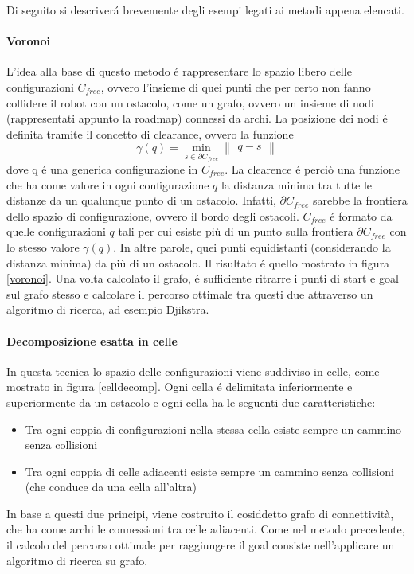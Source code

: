 \documentclass[14pt,a4paper]{extarticle}
\begin{document}
Di seguito si descriverá brevemente degli esempi legati ai metodi appena elencati.

\paragraph{Voronoi} L'idea alla base di questo metodo é rappresentare lo spazio libero delle configurazioni \(C_{free}\), ovvero l'insieme di quei punti che per certo non fanno collidere il robot con un ostacolo, come un grafo, ovvero un insieme di nodi (rappresentati appunto la roadmap) connessi da archi. La posizione dei nodi é definita tramite il concetto di clearance, ovvero la funzione \[\gamma(q) = \min_{s\in\partial C_{free}} \begin{Vmatrix}q-s\end{Vmatrix}\] dove q é una generica configurazione in \(C_{free}\). La clearence é perciò una funzione che ha come valore in ogni configurazione \(q\) la distanza minima tra tutte le distanze da un qualunque punto di un ostacolo. Infatti, \(\partial C_{free}\) sarebbe la frontiera dello spazio di configurazione, ovvero il bordo degli ostacoli. \(C_{free}\) é formato da quelle configurazioni \(q\) tali per cui esiste più di un punto sulla frontiera \(\partial C_{free}\) con lo stesso valore \(\gamma(q)\). In altre parole, quei punti equidistanti (considerando la distanza minima) da più di un ostacolo. Il risultato é quello mostrato in figura \ref{voronoi}. Una volta calcolato il grafo, é sufficiente ritrarre i punti di start e goal sul grafo stesso e calcolare il percorso ottimale tra questi due attraverso un algoritmo di ricerca, ad esempio Djikstra.

\paragraph{Decomposizione esatta in celle} In questa tecnica lo spazio delle configurazioni viene suddiviso in celle, come mostrato in figura \ref{celldecomp}. Ogni cella é delimitata inferiormente e superiormente da un ostacolo e ogni cella ha le seguenti due caratteristiche:
\begin{itemize}
\item Tra ogni coppia di configurazioni nella stessa cella esiste sempre un cammino senza collisioni
\item Tra ogni coppia di celle adiacenti esiste sempre un cammino senza collisioni (che conduce da una cella all'altra)
\end{itemize}
In base a questi due principi, viene costruito il cosiddetto grafo di connettività, che ha come archi le connessioni tra celle adiacenti. Come nel metodo precedente, il calcolo del percorso ottimale per raggiungere il goal consiste nell'applicare un algoritmo di ricerca su grafo.
\end{document}
